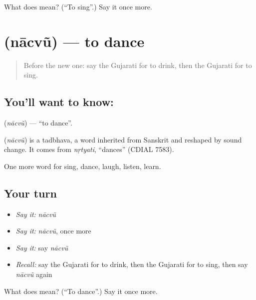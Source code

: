 \begin{tcolorbox}[breakable,colback=teal!4,colframe=teal!35!black,title={Before you move on}]
What does  mean? (\textquotedblleft{}To sing\textquotedblright{}.) Say it once more.
\end{tcolorbox}
\section[\texorpdfstring{\gu{નાચવું} (nācvũ)}{નાચવું (nācvũ)}]{ (nācvũ) — to dance}

\label{lesson:GU-C56-naachvu}



\begin{quote}
Before the new one: say the Gujarati for to drink, then the Gujarati for to sing.
\end{quote}

\subsection*{You'll want to know: }
\textbf{} (\emph{nācvũ}) — \textquotedblleft{}to dance\textquotedblright{}.

\begin{cousinweb}
\textbf{} (\emph{nācvũ}) is a tadbhava, a word inherited from Sanskrit and reshaped by sound change. It comes from \emph{nṛtyati}, \textquotedblleft{}dances\textquotedblright{} (CDIAL 7583).
\end{cousinweb}

\begin{grammarlens}[title={What you've built}]
One more word for sing, dance, laugh, listen, learn.
\end{grammarlens}

\subsection*{Your turn}
\begin{itemize}
\raggedright
  \item \emph{Say it:} \emph{nācvũ}
  \item \emph{Say it:} \emph{nācvũ}, once more
  \item \emph{Say it:} say \emph{nācvũ}
  \item \emph{Recall:} say the Gujarati for to drink, then the Gujarati for to sing, then say \emph{nācvũ} again
\end{itemize}

\begin{tcolorbox}[breakable,colback=teal!4,colframe=teal!35!black,title={Before you move on}]
What does  mean? (\textquotedblleft{}To dance\textquotedblright{}.) Say it once more.
\end{tcolorbox}
